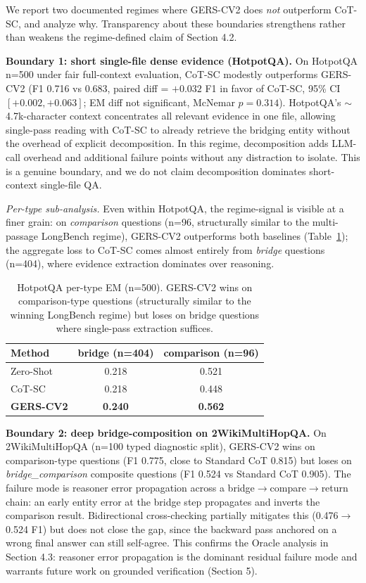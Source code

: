 \documentclass[11pt,a4paper]{article}
\begin{document}
We report two documented regimes where GERS-CV2 does \emph{not} outperform CoT-SC, and analyze why. Transparency about these boundaries strengthens rather than weakens the regime-defined claim of Section 4.2.

\textbf{Boundary 1: short single-file dense evidence (HotpotQA).} On HotpotQA n=500 under fair full-context evaluation, CoT-SC modestly outperforms GERS-CV2 (F1 0.716 vs 0.683, paired diff = $+0.032$ F1 in favor of CoT-SC, 95\% CI $[+0.002, +0.063]$; EM diff not significant, McNemar $p=0.314$). HotpotQA's ${\sim}$4.7k-character context concentrates all relevant evidence in one file, allowing single-pass reading with CoT-SC to already retrieve the bridging entity without the overhead of explicit decomposition. In this regime, decomposition adds LLM-call overhead and additional failure points without any distraction to isolate. This is a genuine boundary, and we do not claim decomposition dominates short-context single-file QA.

\emph{Per-type sub-analysis.} Even within HotpotQA, the regime-signal is visible at a finer grain: on \emph{comparison} questions (n=96, structurally similar to the multi-passage LongBench regime), GERS-CV2 outperforms both baselines (Table~\ref{tab:hpqa_type}); the aggregate loss to CoT-SC comes almost entirely from \emph{bridge} questions (n=404), where evidence extraction dominates over reasoning.

\begin{table}[h]
\centering
\caption{HotpotQA per-type EM (n=500). GERS-CV2 wins on comparison-type questions (structurally similar to the winning LongBench regime) but loses on bridge questions where single-pass extraction suffices.}
\label{tab:hpqa_type}
\begin{tabular}{lcc}
\toprule
Method & bridge (n=404) & comparison (n=96) \\
\midrule
Zero-Shot & 0.218 & 0.521 \\
CoT-SC & 0.218 & 0.448 \\
\textbf{GERS-CV2} & \textbf{0.240} & \textbf{0.562} \\
\bottomrule
\end{tabular}
\end{table}

\textbf{Boundary 2: deep bridge-composition on 2WikiMultiHopQA.} On 2WikiMultiHopQA (n=100 typed diagnostic split), GERS-CV2 wins on comparison-type questions (F1 0.775, close to Standard CoT 0.815) but loses on \emph{bridge\_comparison} composite questions (F1 0.524 vs Standard CoT 0.905). The failure mode is reasoner error propagation across a bridge$\to$compare$\to$return chain: an early entity error at the bridge step propagates and inverts the comparison result. Bidirectional cross-checking partially mitigates this (0.476$\to$0.524 F1) but does not close the gap, since the backward pass anchored on a wrong final answer can still self-agree. This confirms the Oracle analysis in Section 4.3: reasoner error propagation is the dominant residual failure mode and warrants future work on grounded verification (Section 5).
\end{document}
